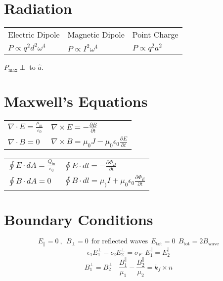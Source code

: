 \documentclass[10pt,a4paper]{article}
\begin{document}
\section{Radiation} %
\label{sec:radiation}
\begin{tabular}{l l l}
Electric Dipole & Magnetic Dipole & Point Charge\\
$P \propto q^2 d^2 \omega^4$ & $P\propto I^2 \omega^4$ & $P \propto q^2 a^2$
\end{tabular}

$P_{\textrm{max}} \perp$ to $\hat{a}$.

\section{Maxwell's Equations} %
\label{sec:maxwell_s_equations}
\begin{tabular}{l l}
$\nabla \cdot E = \frac{\rho_{\textrm{in}}}{\epsilon_0}$ & $\nabla \times E = - \frac{\partial B}{\partial t}$\\
$\nabla \cdot B = 0$ & $\nabla \times B = \mu_0 J - \mu_0 \epsilon_0 \frac{\partial E}{\partial t}$
\end{tabular}

\begin{tabular}{ll}
$\oint E \cdot dA = \frac{Q_{\textrm{in}}}{\epsilon_0}$ & $\oint E \cdot dl = - \frac{\partial \Phi_B}{\partial t}$\\
$\oint B \cdot dA = 0$ & $\oint B \cdot dl = \mu_) I + \mu_0 \epsilon_0 \frac{\partial \Phi_E}{\partial t}$
\end{tabular}

\section{Boundary Conditions} %
\label{sec:boundary_conditions}
\begin{equation}
    E_\parallel = 0~,~~ B_\perp = 0~~\textrm{for reflected waves}~~ E_{\textrm{tot}}=0~~ B_{\textrm{tot}} = 2B_{\textrm{wave}}
\end{equation}
\begin{equation}
    \epsilon_1 E_1^\perp - \epsilon_2 E_2^\perp = \sigma_F~~E_1^\parallel = E_2^\parallel
\end{equation}
\begin{equation}
    B_1 ^\perp = B_2^\perp ~~~~ \frac{B_1^\parallel}{\mu_1} - \frac{B_2^\parallel}{\mu_2} = k_f \times \hat{n}
\end{equation}
\end{document}
